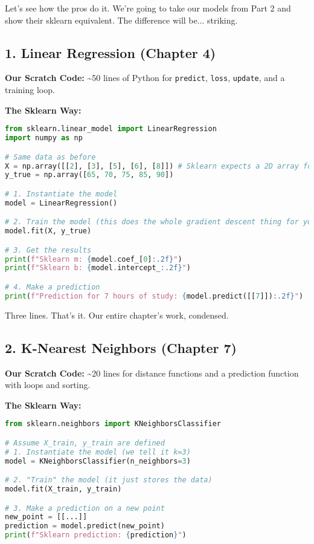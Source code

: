 \documentclass[11pt, letterpaper, openany]{book}
\begin{document}
Let's see how the pros do it. We're going to take our models from Part 2 and show their sklearn equivalent. The difference will be... striking.

\subsection{1. Linear Regression (Chapter 4)}

\textbf{Our Scratch Code:} \textasciitilde50 lines of Python for \texttt{predict}, \texttt{loss}, \texttt{update}, and a training loop.

\textbf{The Sklearn Way:}
\begin{lstlisting}[language=Python]
from sklearn.linear_model import LinearRegression
import numpy as np

# Same data as before
X = np.array([[2], [3], [5], [6], [8]]) # Sklearn expects a 2D array for X
y_true = np.array([65, 70, 75, 85, 90])

# 1. Instantiate the model
model = LinearRegression()

# 2. Train the model (this does the whole gradient descent thing for you)
model.fit(X, y_true)

# 3. Get the results
print(f"Sklearn m: {model.coef_[0]:.2f}")
print(f"Sklearn b: {model.intercept_:.2f}")

# 4. Make a prediction
print(f"Prediction for 7 hours of study: {model.predict([[7]]):.2f}")
\end{lstlisting}
Three lines. That's it. Our entire chapter's work, condensed.

\subsection{2. K-Nearest Neighbors (Chapter 7)}

\textbf{Our Scratch Code:} \textasciitilde20 lines for distance functions and a prediction function with loops and sorting.

\textbf{The Sklearn Way:}
\begin{lstlisting}[language=Python]
from sklearn.neighbors import KNeighborsClassifier

# Assume X_train, y_train are defined
# 1. Instantiate the model (we tell it k=3)
model = KNeighborsClassifier(n_neighbors=3)

# 2. "Train" the model (it just stores the data)
model.fit(X_train, y_train)

# 3. Make a prediction on a new point
new_point = [[...]]
prediction = model.predict(new_point)
print(f"Sklearn prediction: {prediction}")
\end{lstlisting}
\end{document}
